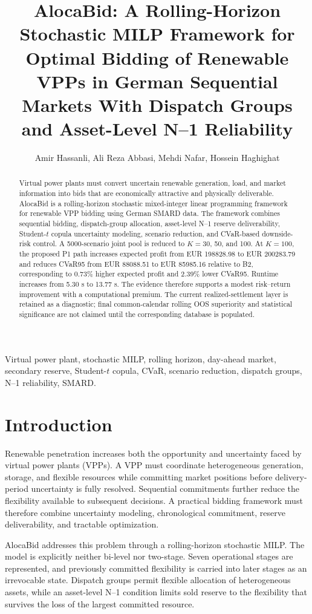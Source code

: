 \documentclass[journal]{IEEEtran}
\title{AlocaBid: A Rolling-Horizon Stochastic MILP Framework for Optimal Bidding of Renewable VPPs in German Sequential Markets With Dispatch Groups and Asset-Level N--1 Reliability}
\author{Amir Hassanli, Ali Reza Abbasi, Mehdi Nafar, Hossein Haghighat}
\begin{document}
\maketitle
\begin{abstract}
Virtual power plants must convert uncertain renewable generation, load, and market information into bids that are economically attractive and physically deliverable. AlocaBid is a rolling-horizon stochastic mixed-integer linear programming framework for renewable VPP bidding using German SMARD data. The framework combines sequential bidding, dispatch-group allocation, asset-level N--1 reserve deliverability, Student-$t$ copula uncertainty modeling, scenario reduction, and CVaR-based downside-risk control. A 5000-scenario joint pool is reduced to $K=30$, 50, and 100. At $K=100$, the proposed P1 path increases expected profit from EUR 198828.98 to EUR 200283.79 and reduces CVaR95 from EUR 88088.51 to EUR 85985.16 relative to B2, corresponding to 0.73\% higher expected profit and 2.39\% lower CVaR95. Runtime increases from 5.30 s to 13.77 s. The evidence therefore supports a modest risk--return improvement with a computational premium. The current realized-settlement layer is retained as a diagnostic; final common-calendar rolling OOS superiority and statistical significance are not claimed until the corresponding database is populated.
\end{abstract}
\begin{IEEEkeywords}Virtual power plant, stochastic MILP, rolling horizon, day-ahead market, secondary reserve, Student-$t$ copula, CVaR, scenario reduction, dispatch groups, N--1 reliability, SMARD.\end{IEEEkeywords}

\section{Introduction}
Renewable penetration increases both the opportunity and uncertainty faced by virtual power plants (VPPs). A VPP must coordinate heterogeneous generation, storage, and flexible resources while committing market positions before delivery-period uncertainty is fully resolved. Sequential commitments further reduce the flexibility available to subsequent decisions. A practical bidding framework must therefore combine uncertainty modeling, chronological commitment, reserve deliverability, and tractable optimization.

AlocaBid addresses this problem through a rolling-horizon stochastic MILP. The model is explicitly neither bi-level nor two-stage. Seven operational stages are represented, and previously committed flexibility is carried into later stages as an irrevocable state. Dispatch groups permit flexible allocation of heterogeneous assets, while an asset-level N--1 condition limits sold reserve to the flexibility that survives the loss of the largest committed resource.
\end{document}
